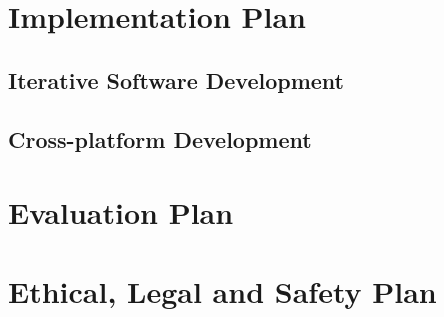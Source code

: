 \section{Implementation Plan}
\subsection{Iterative Software Development}

\subsection{Cross-platform Development}


\section{Evaluation Plan}


\section{Ethical, Legal and Safety Plan}